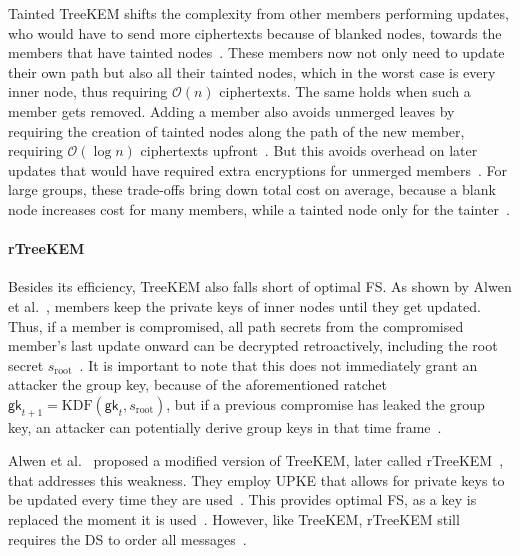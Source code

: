 \documentclass[conference]{IEEEtran}
\begin{document}
Tainted TreeKEM shifts the complexity from other members performing updates, who would have to send more ciphertexts because of blanked nodes, towards the members that have tainted nodes~\cite{kleinKeepDirtTainted2021}.
These members now not only need to update their own path but also all their tainted nodes, which in the worst case is every inner node, thus requiring $\mathcal{O}(n)$ ciphertexts.
The same holds when such a member gets removed.
Adding a member also avoids unmerged leaves by requiring the creation of tainted nodes along the path of the new member, requiring $\mathcal{O}(\log n)$ ciphertexts upfront~\cite{kleinKeepDirtTainted2021}.
But this avoids overhead on later updates that would have required extra encryptions for unmerged members~\cite{barnesMessagingLayerSecurity2023}.
For large groups, these trade-offs bring down total cost on average, because a blank node increases cost for many members, while a tainted node only for the tainter~\cite{kleinKeepDirtTainted2021}.

\paragraph{rTreeKEM}
Besides its efficiency, TreeKEM also falls short of optimal \ac{FS}.
As shown by Alwen et al.~\cite{alwenSecurityAnalysisImprovements2020}, members keep the private keys of inner nodes until they get updated.
Thus, if a member is compromised, all path secrets from the compromised member's last update onward can be decrypted retroactively, including the root secret $s_{\mathrm{root}}$~\cite{alwenSecurityAnalysisImprovements2020}.
It is important to note that this does not immediately grant an attacker the group key, because of the aforementioned ratchet $\mathsf{gk}_{t+1} = \mathrm{KDF}(\mathsf{gk}_t, s_{\mathrm{root}})$, but if a previous compromise has leaked the group key, an attacker can potentially derive group keys in that time frame~\cite{alwenInsiderSecurityMLS2022}.

Alwen et al.~\cite{alwenSecurityAnalysisImprovements2020} proposed a modified version of TreeKEM, later called rTreeKEM~\cite{kleinKeepDirtTainted2021}, that addresses this weakness.
They employ \ac{UPKE} that allows for private keys to be updated every time they are used~\cite{alwenSecurityAnalysisImprovements2020}.
This provides optimal \ac{FS}, as a key is replaced the moment it is used~\cite{alwenSecurityAnalysisImprovements2020}.
However, like TreeKEM, rTreeKEM still requires the \ac{DS} to order all messages~\cite{alwenSecurityAnalysisImprovements2020}.
\end{document}

